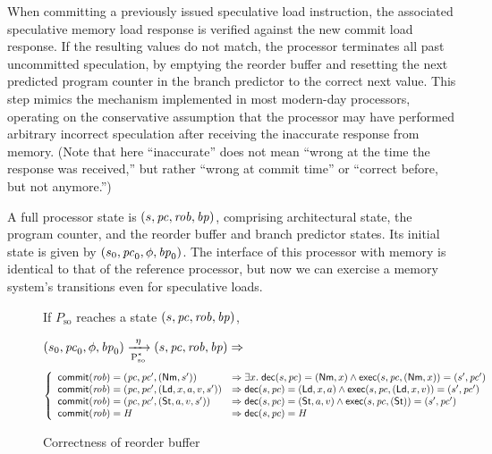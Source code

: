 When committing a
previously issued speculative load instruction, the associated speculative
memory load response is verified against the new commit load response. If the
resulting values do not match, the processor terminates all past uncommitted
speculation, by emptying the reorder buffer and resetting the
next predicted program counter in the branch predictor to the correct next value. This step mimics
the mechanism implemented in most modern-day processors, operating on the
conservative assumption that the processor may have performed arbitrary
incorrect speculation after receiving the inaccurate response from
memory.  (Note that here ``inaccurate'' does not mean ``wrong at
the time the response was received,'' but rather ``wrong at commit
time'' or ``correct before, but not anymore.'')

A full processor state is $(s, \pc, \rob, \ppc)$, comprising
architectural state, the program counter, and the reorder buffer and branch
predictor states. Its initial state is given by $(s_0, \pc_0, \phi, \ppc_0)$.
The interface of this processor with memory is identical
to that of the reference processor, but now we can exercise a memory
system's transitions even for speculative loads.

\begin{figure*}[t]
\small
\begin{inv}
If $P_\text{so}$ reaches a state $(s, \pc, \rob, \ppc)$, \ie{}

$\io{P$_\text{so}^{*}$}{s_0,\pc_0,\phi,\ppc_0}{s,\pc,\rob,\ppc}{\eta} \Rightarrow$
\begin{displaymath}
\left\{
\begin{array}{ll}
\commit(\rob) = (\pc, \pc', (\nm, s')) &\Rightarrow
\exists x. \; \dec(s,\pc) = (\nm, x) \wedge \exec(s,\pc, (\nm,x)) =
(s', \pc')\\
\commit(\rob) = (\pc, \pc', (\ld, x, a, v, s')) & \Rightarrow
\dec(s,\pc) = (\ld, x,a) \wedge \exec(s,\pc, (\ld,x,v)) = (s',\pc')\\
\commit(\rob) = (\pc, \pc', (\st, a, v, s')) &\Rightarrow
\dec(s,\pc) = (\st, a,v) \wedge \exec(s,\pc, (\st)) =
(s',\pc')\\
\commit(\rob) = H & \Rightarrow
\dec(s, \pc) = H\\
\end{array}
\right.\end{displaymath}
\label{rob}
\end{inv}
\vspace{-.5cm}
\caption{Correctness of reorder buffer}
\label{robfig}
\end{figure*}

